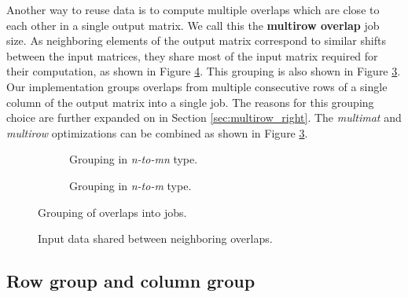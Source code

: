 Another way to reuse data is to compute multiple overlaps which are close to each other in a single output matrix. 
We call this the \textbf{multirow overlap} job size. As neighboring elements of the output matrix correspond to similar shifts between the input matrices, they share most of the input matrix required for their computation, as shown in Figure \ref{fig:multirow_shared_input}. This grouping is also shown in Figure \ref{fig:job_size_modifiers}. Our implementation groups overlaps from multiple consecutive rows of a single column of the output matrix into a single job. The reasons for this grouping choice are further expanded on in Section \ref{sec:multirow_right}.
The \textit{multimat} and \textit{multirow} optimizations can be combined as shown in Figure \ref{fig:job_size_modifiers}.


\begin{figure}[ht]
	\centering	
	\begin{subfigure}{0.4\textwidth}
		\centering
		\def\svgwidth{\textwidth}
		\fontsize{8}{10}\selectfont
		
		\caption{Grouping in \textit{n-to-mn} type.}
		\label{fig:job_size_modifiers_n_to_mn}
	\end{subfigure}
	\hfill
	\begin{subfigure}{0.4\textwidth}
		\centering
		\def\svgwidth{\textwidth}
		\fontsize{8}{10}\selectfont
		
		\caption{Grouping in \textit{n-to-m} type.}
		\label{fig:job_size_modifiers_n_to_m}
	\end{subfigure}
	
	\caption{Grouping of overlaps into jobs.}
	\label{fig:job_size_modifiers}
\end{figure}

\begin{figure}[ht]
	\centering
	\def\svgwidth{0.5\textwidth}
	\fontsize{8}{10}\selectfont
	
	\caption{Input data shared between neighboring overlaps.}
	\label{fig:multirow_shared_input}
\end{figure}

\subsection{Row group and column group}
\label{sec:data_reuse_row_column_group}

